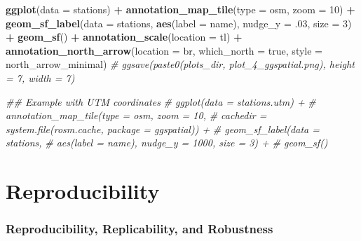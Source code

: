 \documentclass[
]{article}
\newenvironment{Shaded}{\begin{snugshade}}{\end{snugshade}}
\newcommand{\CommentTok}[1]{\textcolor[rgb]{0.56,0.35,0.01}{\textit{#1}}}
\newcommand{\DataTypeTok}[1]{\textcolor[rgb]{0.13,0.29,0.53}{#1}}
\newcommand{\DecValTok}[1]{\textcolor[rgb]{0.00,0.00,0.81}{#1}}
\newcommand{\FloatTok}[1]{\textcolor[rgb]{0.00,0.00,0.81}{#1}}
\newcommand{\KeywordTok}[1]{\textcolor[rgb]{0.13,0.29,0.53}{\textbf{#1}}}
\newcommand{\NormalTok}[1]{#1}
\newcommand{\OperatorTok}[1]{\textcolor[rgb]{0.81,0.36,0.00}{\textbf{#1}}}
\newcommand{\StringTok}[1]{\textcolor[rgb]{0.31,0.60,0.02}{#1}}
\begin{document}
\begin{Shaded}
\begin{Highlighting}[]
\KeywordTok{ggplot}\NormalTok{(}\DataTypeTok{data =}\NormalTok{ stations) }\OperatorTok{+}
\StringTok{    }\KeywordTok{annotation\_map\_tile}\NormalTok{(}\DataTypeTok{type =} \StringTok{\textquotesingle{}osm\textquotesingle{}}\NormalTok{, }\DataTypeTok{zoom =} \DecValTok{10}\NormalTok{) }\OperatorTok{+}
\StringTok{    }\KeywordTok{geom\_sf\_label}\NormalTok{(}\DataTypeTok{data =}\NormalTok{ stations, }
                  \KeywordTok{aes}\NormalTok{(}\DataTypeTok{label =}\NormalTok{ name), }\DataTypeTok{nudge\_y =} \FloatTok{.03}\NormalTok{, }\DataTypeTok{size =} \DecValTok{3}\NormalTok{) }\OperatorTok{+}
\StringTok{    }\KeywordTok{geom\_sf}\NormalTok{() }\OperatorTok{+}
\StringTok{    }\KeywordTok{annotation\_scale}\NormalTok{(}\DataTypeTok{location =} \StringTok{\textquotesingle{}tl\textquotesingle{}}\NormalTok{) }\OperatorTok{+}
\StringTok{    }\KeywordTok{annotation\_north\_arrow}\NormalTok{(}\DataTypeTok{location =} \StringTok{\textquotesingle{}br\textquotesingle{}}\NormalTok{, }\DataTypeTok{which\_north =} \StringTok{\textquotesingle{}true\textquotesingle{}}\NormalTok{, }
                           \DataTypeTok{style =}\NormalTok{ north\_arrow\_minimal)}
\CommentTok{\# ggsave(paste0(plots\_dir, \textquotesingle{}plot\_4\_ggspatial.png\textquotesingle{}), height = 7, width = 7)}

\CommentTok{\#\# Example with UTM coordinates}
\CommentTok{\# ggplot(data = stations.utm) +}
\CommentTok{\#     annotation\_map\_tile(type = \textquotesingle{}osm\textquotesingle{}, zoom = 10,}
\CommentTok{\#                         cachedir = system.file(\textquotesingle{}rosm.cache\textquotesingle{}, package = \textquotesingle{}ggspatial\textquotesingle{})) +}
\CommentTok{\#     geom\_sf\_label(data = stations,}
\CommentTok{\#                   aes(label = name), nudge\_y = 1000, size = 3) +}
\CommentTok{\#     geom\_sf()}
\end{Highlighting}
\end{Shaded}

\hypertarget{part-reproducibility}{%
\part{Reproducibility}\label{part-reproducibility}}

\hypertarget{reproducibility-replicability-and-robustness}{%
\section{Reproducibility, Replicability, and Robustness}\label{reproducibility-replicability-and-robustness}}
\end{document}
